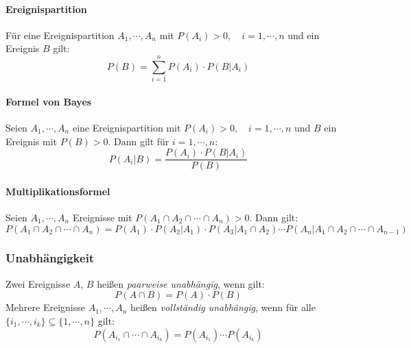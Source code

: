 				\paragraph{Ereignispartition}
					Für eine Ereignispartition \( A_1, \cdots, A_n \) mit \( P(A_i) > 0, \quad i = 1, \cdots, n \) und ein Ereignis \(B\) gilt:
					\begin{equation*}
						P(B) = \sum_{i = 1}^{n} P(A_i) \cdot P(B \vert A_i)
					\end{equation*}

				\paragraph{Formel von Bayes}
					Seien \( A_1, \cdots, A_n \) eine Ereignispartition mit \( P(A_i) > 0, \quad i = 1, \cdots, n \) und \(B\) ein Ereignis mit \(P(B) > 0\). Dann gilt für \( i = 1, \cdots, n \):
					\begin{equation*}
						P(A_i \vert B) = \frac{P(A_i) \cdot P(B \vert A_i)}{P(B)}
					\end{equation*}

				\paragraph{Multiplikationsformel}
					Seien \( A_1, \cdots, A_n \) Ereignisse mit \( P(A_1 \cap A_2 \cap \cdots \cap A_n) > 0 \). Dann gilt:
					\begin{equation*}
						P(A_1 \cap A_2 \cap \cdots \cap A_n) = P(A_1) \cdot P(A_2 \vert A_1) \cdot P(A_3 \vert A_1 \cap A_2) \cdots P(A_n \vert A_1 \cap A_2 \cap \cdots \cap A_{n - 1})
					\end{equation*}

			\subsubsection{Unabhängigkeit}
				Zwei Ereignisse \(A\), \(B\) heißen \textit{paarweise unabhängig}, wenn gilt:
				\begin{equation*}
					P(A \cap B) = P(A) \cdot P(B)
				\end{equation*}
				Mehrere Ereignisse \( A_1, \cdots, A_n \) heißen \textit{vollständig unabhängig}, wenn für alle \( \{ i_1, \cdots, i_k \} \subseteq \{ 1, \cdots, n \} \) gilt:
				\begin{equation*}
					P(A_{i_1} \cap \cdots \cap A_{i_k}) = P(A_{i_1}) \cdots P(A_{i_k})
				\end{equation*}

